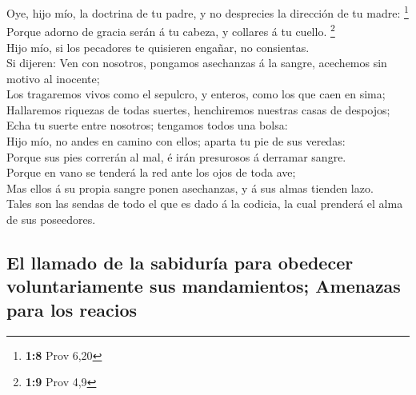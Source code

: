  Oye, hijo mío, la doctrina de tu padre, y no desprecies la
dirección de tu madre: \footnote{\textbf{1:8} Prov 6,20}\\
 Porque adorno de gracia serán á tu cabeza, y collares á tu
cuello. \footnote{\textbf{1:9} Prov 4,9}\\
 Hijo mío, si los pecadores te quisieren engañar, no
consientas.\\
 Si dijeren: Ven con nosotros, pongamos asechanzas á la
sangre, acechemos sin motivo al inocente;\\
 Los tragaremos vivos como el sepulcro, y enteros, como los
que caen en sima;\\
 Hallaremos riquezas de todas suertes, henchiremos nuestras
casas de despojos;\\
 Echa tu suerte entre nosotros; tengamos todos una bolsa:\\
 Hijo mío, no andes en camino con ellos; aparta tu pie de
sus veredas:\\
 Porque sus pies correrán al mal, é irán presurosos á
derramar sangre.\\
 Porque en vano se tenderá la red ante los ojos de toda
ave;\\
 Mas ellos á su propia sangre ponen asechanzas, y á sus
almas tienden lazo.\\
 Tales son las sendas de todo el que es dado á la codicia,
la cual prenderá el alma de sus poseedores.

\hypertarget{el-llamado-de-la-sabiduruxeda-para-obedecer-voluntariamente-sus-mandamientos-amenazas-para-los-reacios}{%
\subsection{El llamado de la sabiduría para obedecer voluntariamente sus
mandamientos; Amenazas para los
reacios}\label{el-llamado-de-la-sabiduruxeda-para-obedecer-voluntariamente-sus-mandamientos-amenazas-para-los-reacios}}

